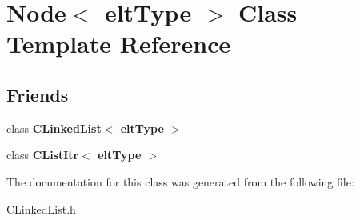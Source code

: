 \hypertarget{classNode}{\section{Node$<$ elt\-Type $>$ Class Template Reference}
\label{classNode}
}
\subsection*{Friends}
\begin{DoxyCompactItemize}
\item 
\hypertarget{classNode_a1550c97b5f3ae3842b3c5dc45d7c2984}{class {\bfseries C\-Linked\-List$<$ elt\-Type $>$}}\label{classNode_a1550c97b5f3ae3842b3c5dc45d7c2984}

\item 
\hypertarget{classNode_ac76a869ca4ec3b044e17f832fd9e1de1}{class {\bfseries C\-List\-Itr$<$ elt\-Type $>$}}\label{classNode_ac76a869ca4ec3b044e17f832fd9e1de1}

\end{DoxyCompactItemize}


The documentation for this class was generated from the following file\-:\begin{DoxyCompactItemize}
\item 
C\-Linked\-List.\-h\end{DoxyCompactItemize}
